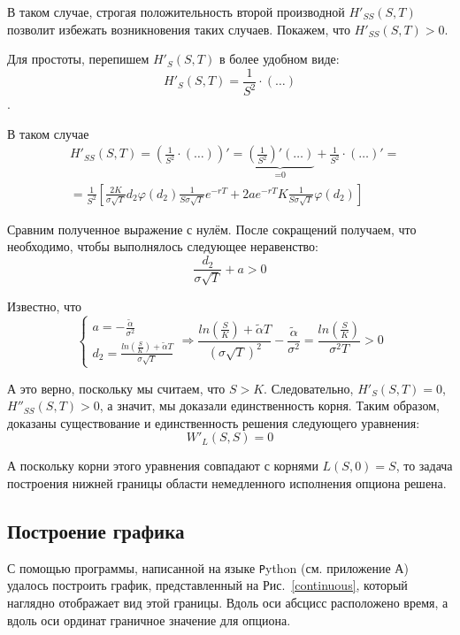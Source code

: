 \documentclass[oneside,final,12pt]{article}
\begin{document}
В таком случае, строгая положительность второй производной $H'_{SS}(S,T)$ позволит избежать возникновения таких случаев. Покажем, что $H'_{SS}(S,T)>0$.

Для простоты, перепишем $H'_S(S,T)$ в более удобном виде: \\ $$H'_S(S,T)=\frac{1}{S^2} \cdot (\ldots)$$. 

В таком случае
\begin{align*}
    & H'_{SS}(S,T) = \left(\frac{1}{S^2} \cdot (\ldots) \right)' = \underbrace{\left(\frac{1}{S^2}\right)'(\ldots)}_{\text{=0}} + \frac{1}{S^2} \cdot \left(\ldots\right)' = \\
    & = \frac{1}{S^2} \left[\frac{2K}{\sigma\sqrt{T}}d_2\varphi(d_2) \frac{1}{S\sigma \sqrt{T}}e^{-rT} +2ae^{-rT}K\frac{1}{S\sigma \sqrt{T}}\varphi(d_2)\right]
\end{align*}

Сравним полученное выражение с нулём. После сокращений получаем, что необходимо, чтобы выполнялось следующее неравенство:
$$ \frac{d_2}{\sigma\sqrt{T}}+a>0$$

Известно, что
$$
\begin{cases}
a = -\frac{\widetilde{\alpha}}{\sigma^2} \\
d_2 = \frac{ln\left(\frac{S}{K}\right)+\widetilde{\alpha}T} {\sigma\sqrt{T}}
\end{cases}
\Rightarrow
\frac{ln\left(\frac{S}{K}\right)+\widetilde{\alpha}T} {(\sigma\sqrt{T})^2} -\frac{\widetilde{\alpha}}{\sigma^2} = \frac{ln\left(\frac{S}{K}\right)}{\sigma^2 T} > 0 
$$

А это верно, поскольку мы считаем, что $S>K$. Следовательно, $H'_S(S,T)=0$,$ H''_{SS}(S,T)>0$, а значит, мы доказали единственность корня. Таким образом, доказаны существование и единственность решения следующего уравнения:
$$ W'_L(S,S) = 0$$

А поскольку корни этого уравнения совпадают с корнями $L(S,0)=S$, то задача построения нижней границы области немедленного исполнения опциона решена.

\newpage
\subsection{Построение графика}

С помощью программы, написанной на языке {\texttt Python} (см. приложение А) удалось построить график, представленный на Рис.~\ref{continuous}, который наглядно отображает вид этой границы. Вдоль оси абсцисс расположено время, а вдоль оси ординат граничное значение для опциона.
\end{document}
